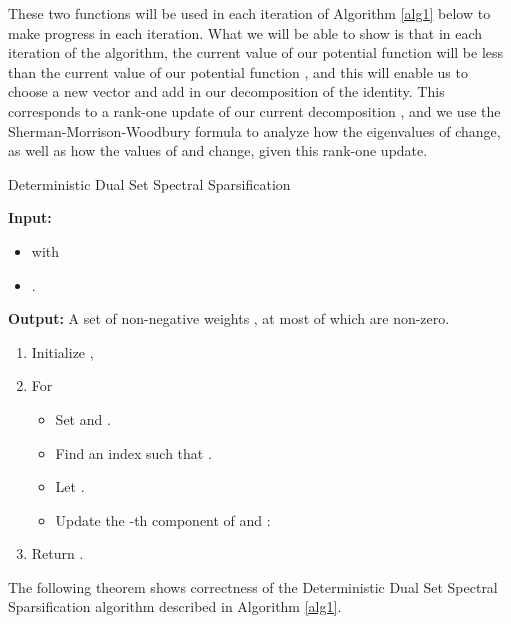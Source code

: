 \documentclass[11pt]{article}
\begin{document}
These two functions will be used in each iteration of Algorithm \ref{alg1} below to make progress in each iteration. 
What we will be able to show is that in each iteration of the algorithm, the current value of our potential function  will be less 
than the current value of our potential function , and this will enable us to choose a new vector  and add  
in our decomposition of the identity. This corresponds to a rank-one update of our current decomposition , 
and we use the Sherman-Morrison-Woodbury formula to analyze how the eigenvalues of  change, as well as how
the values of  and  change, given this rank-one update. 

\begin{algorithm}[t]
\caption{Deterministic Dual Set Spectral Sparsification}
\label{alg1}
{\bf Input:} 
\begin{itemize}
\item  with 
\item . 
\end{itemize}
{\bf Output:}
A set of  non-negative weights , at most  of which are non-zero. 
\begin{enumerate}
\item Initialize , 
\item For 
\begin{itemize}
\item Set  and . 
\item Find an index  such that
. 
\item Let . 
\item Update the -th component of  and :

\end{itemize}
\item Return .
\end{enumerate}
\end{algorithm}
The following theorem shows correctness of 
the Deterministic Dual Set Spectral Sparsification algorithm
described in Algorithm \ref{alg1}. 
\end{document}
